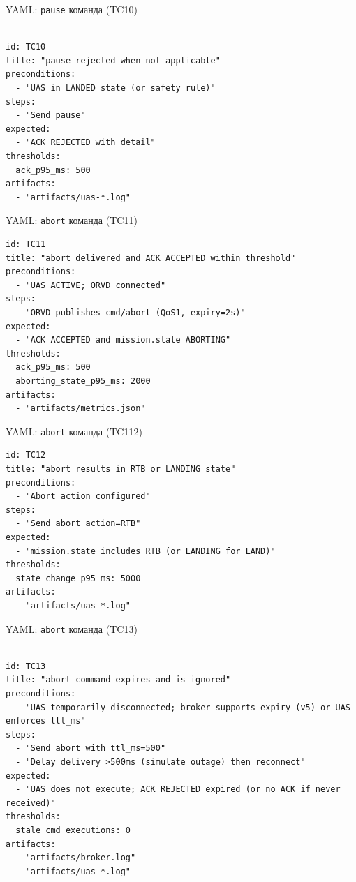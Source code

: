 \documentclass[aspectratio=169]{beamer}
\begin{document}
\begin{frame}[fragile]{YAML: \texttt{pause} команда (TC10)}
\begin{Verbatim}[fontsize=\scriptsize, baselinestretch=0.85]

id: TC10
title: "pause rejected when not applicable"
preconditions:
  - "UAS in LANDED state (or safety rule)"
steps:
  - "Send pause"
expected:
  - "ACK REJECTED with detail"
thresholds:
  ack_p95_ms: 500
artifacts:
  - "artifacts/uas-*.log"
\end{Verbatim}
\end{frame}

\begin{frame}[fragile]{YAML: \texttt{abort} команда (TC11)}
\begin{Verbatim}[fontsize=\scriptsize, baselinestretch=0.85]
id: TC11
title: "abort delivered and ACK ACCEPTED within threshold"
preconditions:
  - "UAS ACTIVE; ORVD connected"
steps:
  - "ORVD publishes cmd/abort (QoS1, expiry=2s)"
expected:
  - "ACK ACCEPTED and mission.state ABORTING"
thresholds:
  ack_p95_ms: 500
  aborting_state_p95_ms: 2000
artifacts:
  - "artifacts/metrics.json"
\end{Verbatim}
\end{frame}

\begin{frame}[fragile]{YAML: \texttt{abort} команда (TC112)}
\begin{Verbatim}[fontsize=\scriptsize, baselinestretch=0.85]
id: TC12
title: "abort results in RTB or LANDING state"
preconditions:
  - "Abort action configured"
steps:
  - "Send abort action=RTB"
expected:
  - "mission.state includes RTB (or LANDING for LAND)"
thresholds:
  state_change_p95_ms: 5000
artifacts:
  - "artifacts/uas-*.log"

\end{Verbatim}
\end{frame}

\begin{frame}[fragile]{YAML: \texttt{abort} команда (TC13)}
\begin{Verbatim}[fontsize=\scriptsize, baselinestretch=0.85]

id: TC13
title: "abort command expires and is ignored"
preconditions:
  - "UAS temporarily disconnected; broker supports expiry (v5) or UAS enforces ttl_ms"
steps:
  - "Send abort with ttl_ms=500"
  - "Delay delivery >500ms (simulate outage) then reconnect"
expected:
  - "UAS does not execute; ACK REJECTED expired (or no ACK if never received)"
thresholds:
  stale_cmd_executions: 0
artifacts:
  - "artifacts/broker.log"
  - "artifacts/uas-*.log"

\end{Verbatim}
\end{frame}
\end{document}
